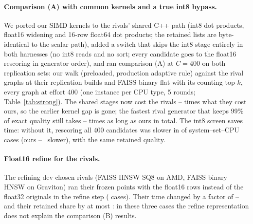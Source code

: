 \paragraph{Comparison (A) with common kernels and a true int8 bypass.} We ported our SIMD kernels to the rivals' shared C++
path (int8 dot products, float16 widening and 16-row float64 dot products; the retained lists are byte-identical to the
scalar path), added a switch that skips the int8 stage entirely in both harnesses (no int8 reads and no sort; every
candidate goes to the float16 rescoring in generator order), and ran comparison (A) at $C = 400$ on both replication
sets: our walk (preloaded, production adaptive rule) against the rival graphs at their replication builds and FAISS
binary flat with its counting top-$k$, every graph at effort 400 (one instance per CPU type, 5 rounds;
Table~\ref{tab:strong}). The shared stages now cost the rivals -- times what they cost
ours, so the earlier kernel gap is gone; the fastest rival generator that keeps 99\% of exact quality still takes
-- times as long as ours in total. The int8 screen saves time: without it, rescoring all 400 candidates was slower in  of
 system--set--CPU cases (ours --~\us{} slower), with the same retained quality.

\begin{table}[h]\centering\scriptsize
\caption{Post hoc comparison (A), held-out, $C = 400$, common SIMD kernels in the shared stages: \us{} per query (median over
5 rounds; in brackets generator + shared stages) with the int8 screen ($H = 100$) and with no int8 stage ($H = 400$,
``bypass''), for our walk and for the fastest rival generator that keeps 99\% of exact quality; Ratio: rival / ours with
the screen; retained share of exact nDCG@10, ours ; rival.}\label{tab:strong}
\setlength{\tabcolsep}{3pt}
\end{table}

\paragraph{Float16 refine for the rivals.} The refining dev-chosen rivals (FAISS HNSW-SQ8 on AMD, FAISS binary HNSW on
Graviton) ran their frozen points with the float16 rows instead of the float32 originals in the refine step
( cases). Their time changed by a factor of -- and their retained share by at most
: in these three cases the refine representation does not explain the comparison (B) results.

